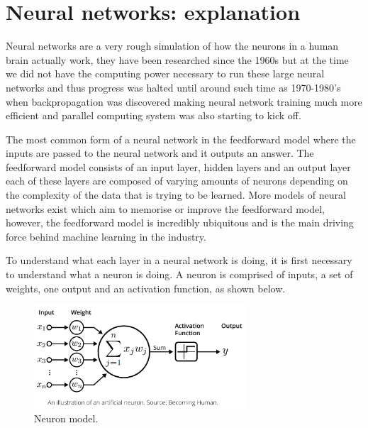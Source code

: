 \documentclass[a4paper,oneside,phd,etd]{BYUPhys}
\begin{document}
\section{Neural networks: explanation}
Neural networks are a very rough simulation of how the neurons in a human brain actually work, they have been researched since the 1960s\cite{neural-network-history} but at the time we did not have the computing power necessary to run these large neural networks and thus progress was halted until around such time as 1970-1980's when backpropagation was discovered making neural network training much more efficient and parallel computing system was also starting to kick off.

The most common form of a neural network in the feedforward model where the inputs are passed to the neural network and it outputs an answer. The feedforward model consists of an input layer, hidden layers and an output layer each of these layers are composed of varying amounts of neurons depending on the complexity of the data that is trying to be learned. More models of neural networks exist which aim to memorise or improve the feedforward model, however, the feedforward model is incredibly ubiquitous and is the main driving force behind machine learning in the industry. 

To understand what each layer in a neural network is doing, it is first necessary to understand what a neuron is doing. A neuron is comprised of inputs, a set of weights, one output and an activation function, as shown below.
\begin{figure}[H]
\centering
\includegraphics[width=8cm]{pictures/neuron_model.png}
\caption{Neuron model.}
\label{fig:neuron_model}
\end{figure}
\end{document}
